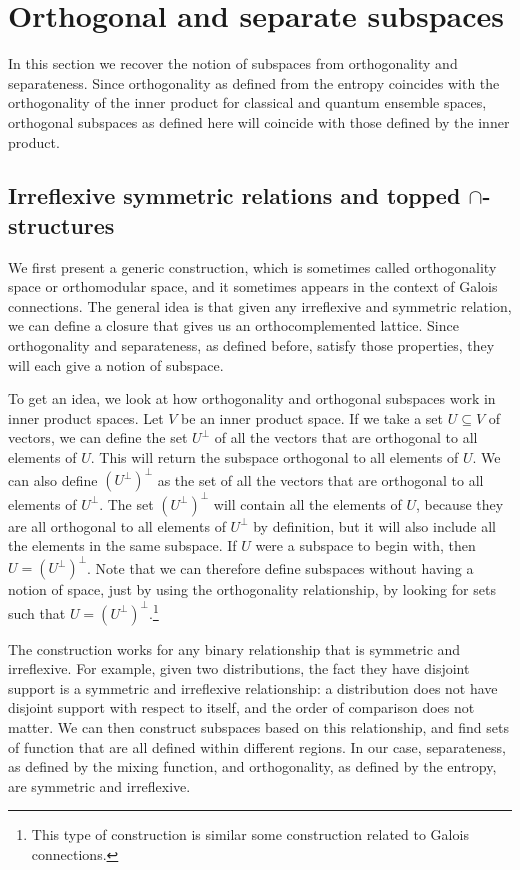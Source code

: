 \section{Orthogonal and separate subspaces}\label{pm_es_subspaceSection}

In this section we recover the notion of subspaces from orthogonality and separateness. Since orthogonality as defined from the entropy coincides with the orthogonality of the inner product for classical and quantum ensemble spaces, orthogonal subspaces as defined here will coincide with those defined by the inner product.

\subsection{Irreflexive symmetric relations and topped $\cap$-structures}

We first present a generic construction, which is sometimes called orthogonality space or orthomodular space, and it sometimes appears in the context of Galois connections. The general idea is that given any irreflexive and symmetric relation, we can define a closure that gives us an orthocomplemented lattice. Since orthogonality and separateness, as defined before, satisfy those properties, they will each give a notion of subspace.

To get an idea, we look at how orthogonality and orthogonal subspaces work in inner product spaces. Let $V$ be an inner product space. If we take a set $U \subseteq V$ of vectors, we can define the set $U^{\perp}$ of all the vectors that are orthogonal to all elements of $U$. This will return the subspace orthogonal to all elements of $U$. We can also define $(U^{\perp})^{\perp}$ as the set of all the vectors that are orthogonal to all elements of $U^{\perp}$. The set $(U^{\perp})^{\perp}$ will contain all the elements of $U$, because they are all orthogonal to all elements of $U^{\perp}$ by definition, but it will also include all the elements in the same subspace. If $U$ were a subspace to begin with, then $U = (U^{\perp})^{\perp}$. Note that we can therefore define subspaces without having a notion of space, just by using the orthogonality relationship, by looking for sets such that $U = (U^{\perp})^{\perp}$.\footnote{This type of construction is similar some construction related to Galois connections.}

The construction works for any binary relationship that is symmetric and irreflexive. For example, given two distributions, the fact they have disjoint support is a symmetric and irreflexive relationship: a distribution does not have disjoint support with respect to itself, and the order of comparison does not matter. We can then construct subspaces based on this relationship, and find sets of function that are all defined within different regions. In our case, separateness, as defined by the mixing function, and orthogonality, as defined by the entropy, are symmetric and irreflexive.

